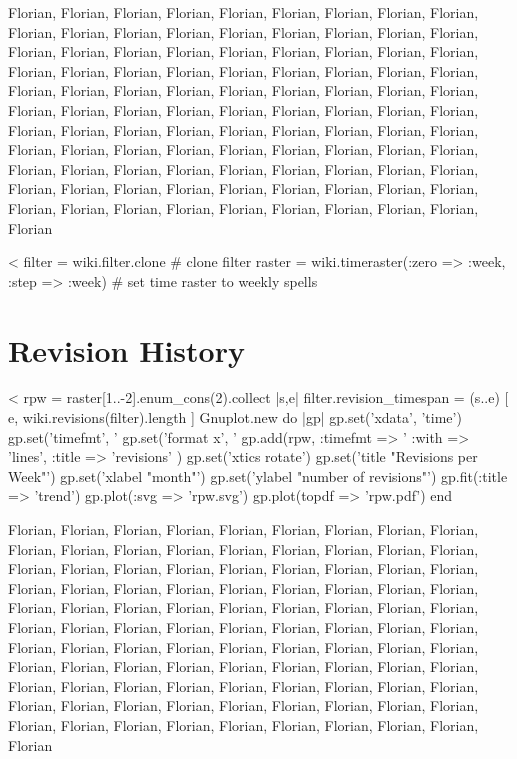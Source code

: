 \documentclass{scrartcl}
\begin{document}
Florian, Florian, Florian, Florian, Florian, Florian, Florian, Florian, Florian, Florian, Florian, Florian, Florian, Florian, Florian, Florian, Florian, Florian, Florian, Florian, Florian, Florian, Florian, Florian, Florian, Florian, Florian, Florian, Florian, Florian, Florian, Florian, Florian, Florian, Florian, Florian, Florian, Florian, Florian, Florian, Florian, Florian, Florian, Florian, Florian, Florian, Florian, Florian, Florian, Florian, Florian, Florian, Florian, Florian, Florian, Florian, Florian, Florian, Florian, Florian, Florian, Florian, Florian, Florian, Florian, Florian, Florian, Florian, Florian, Florian, Florian, Florian, Florian, Florian, Florian, Florian, Florian, Florian, Florian, Florian, Florian, Florian, Florian, Florian, Florian, Florian, Florian, Florian, Florian, Florian, Florian, Florian, Florian, Florian, Florian, Florian, Florian, Florian, Florian, Florian


<%
filter = wiki.filter.clone # clone filter
raster = wiki.timeraster(:zero => :week, :step => :week) # set time raster to weekly spells

\section{Revision History} %
\label{sec:revision_history}

<%
rpw = raster[1..-2].enum_cons(2).collect { |s,e| 
	filter.revision_timespan = (s..e)
	[ e, wiki.revisions(filter).length ]
	}
Gnuplot.new do |gp|
	gp.set('xdata', 'time')
	gp.set('timefmt', '%
	gp.set('format x', '%
	gp.add(rpw, :timefmt => '%
		:with => 'lines', 
		:title => 'revisions' )
	gp.set('xtics rotate')
	gp.set('title "Revisions per Week"')
	gp.set('xlabel "month"')
	gp.set('ylabel "number of revisions"')
	gp.fit(:title => 'trend')
	gp.plot(:svg => 'rpw.svg')
	gp.plot(topdf => 'rpw.pdf')
end

Florian, Florian, Florian, Florian, Florian, Florian, Florian, Florian, Florian, Florian, Florian, Florian, Florian, Florian, Florian, Florian, Florian, Florian, Florian, Florian, Florian, Florian, Florian, Florian, Florian, Florian, Florian, Florian, Florian, Florian, Florian, Florian, Florian, Florian, Florian, Florian, Florian, Florian, Florian, Florian, Florian, Florian, Florian, Florian, Florian, Florian, Florian, Florian, Florian, Florian, Florian, Florian, Florian, Florian, Florian, Florian, Florian, Florian, Florian, Florian, Florian, Florian, Florian, Florian, Florian, Florian, Florian, Florian, Florian, Florian, Florian, Florian, Florian, Florian, Florian, Florian, Florian, Florian, Florian, Florian, Florian, Florian, Florian, Florian, Florian, Florian, Florian, Florian, Florian, Florian, Florian, Florian, Florian, Florian, Florian, Florian, Florian, Florian, Florian, Florian
\end{document}
